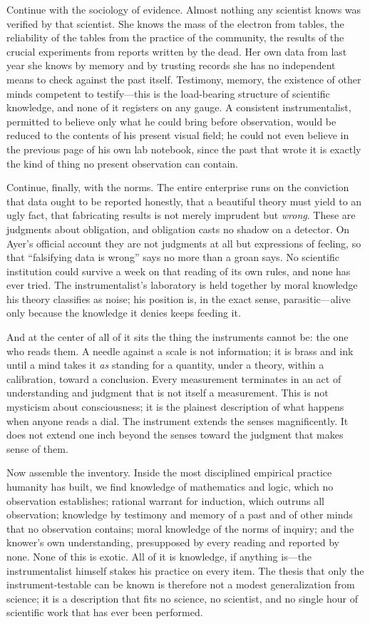 Continue with the sociology of evidence. Almost nothing any scientist knows was verified by that scientist. She knows the mass of the electron from tables, the reliability of the tables from the practice of the community, the results of the crucial experiments from reports written by the dead. Her own data from last year she knows by memory and by trusting records she has no independent means to check against the past itself. Testimony, memory, the existence of other minds competent to testify---this is the load-bearing structure of scientific knowledge, and none of it registers on any gauge. A consistent instrumentalist, permitted to believe only what he could bring before observation, would be reduced to the contents of his present visual field; he could not even believe in the previous page of his own lab notebook, since the past that wrote it is exactly the kind of thing no present observation can contain.

Continue, finally, with the norms. The entire enterprise runs on the conviction that data ought to be reported honestly, that a beautiful theory must yield to an ugly fact, that fabricating results is not merely imprudent but \emph{wrong}. These are judgments about obligation, and obligation casts no shadow on a detector. On Ayer's official account they are not judgments at all but expressions of feeling, so that ``falsifying data is wrong'' says no more than a groan says. No scientific institution could survive a week on that reading of its own rules, and none has ever tried. The instrumentalist's laboratory is held together by moral knowledge his theory classifies as noise; his position is, in the exact sense, parasitic---alive only because the knowledge it denies keeps feeding it.

And at the center of all of it sits the thing the instruments cannot be: the one who reads them. A needle against a scale is not information; it is brass and ink until a mind takes it \emph{as} standing for a quantity, under a theory, within a calibration, toward a conclusion. Every measurement terminates in an act of understanding and judgment that is not itself a measurement. This is not mysticism about consciousness; it is the plainest description of what happens when anyone reads a dial. The instrument extends the senses magnificently. It does not extend one inch beyond the senses toward the judgment that makes sense of them.

Now assemble the inventory. Inside the most disciplined empirical practice humanity has built, we find knowledge of mathematics and logic, which no observation establishes; rational warrant for induction, which outruns all observation; knowledge by testimony and memory of a past and of other minds that no observation contains; moral knowledge of the norms of inquiry; and the knower's own understanding, presupposed by every reading and reported by none. None of this is exotic. All of it is knowledge, if anything is---the instrumentalist himself stakes his practice on every item. The thesis that only the instrument-testable can be known is therefore not a modest generalization from science; it is a description that fits no science, no scientist, and no single hour of scientific work that has ever been performed.

